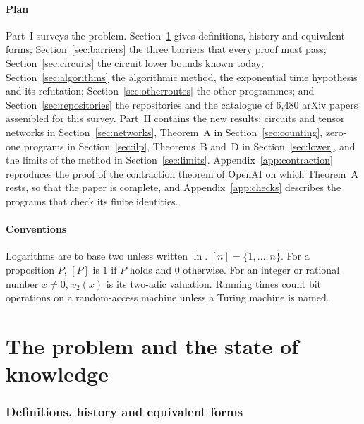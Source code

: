 \documentclass[11pt,reqno]{amsart}
\numberwithin{equation}{section}
\theoremstyle{plain}
\theoremstyle{definition}
\theoremstyle{remark}
\newcommand{\oai}{OpenAI}
\newcommand{\vtwo}{v_2}
\begin{document}
\subsection{Plan}
Part~I surveys the problem. Section~\ref{sec:history} gives definitions, history
and equivalent forms; Section~\ref{sec:barriers} the three barriers that every
proof must pass; Section~\ref{sec:circuits} the circuit lower bounds known
today; Section~\ref{sec:algorithms} the algorithmic method, the exponential time
hypothesis and its refutation; Section~\ref{sec:otherroutes} the other
programmes; and Section~\ref{sec:repositories} the repositories and the
catalogue of 6,480 arXiv papers assembled for this survey. Part~II contains the
new results: circuits and tensor networks in Section~\ref{sec:networks},
Theorem~A in Section~\ref{sec:counting}, zero-one programs in
Section~\ref{sec:ilp}, Theorems~B and~D in Section~\ref{sec:lower}, and the
limits of the method in Section~\ref{sec:limits}.
Appendix~\ref{app:contraction} reproduces the proof of the contraction theorem
of \oai{} \cite[Appendix D.4]{OAI26} on which Theorem~A rests, so that the paper
is complete, and Appendix~\ref{app:checks} describes the programs that check its
finite identities.

\subsection*{Conventions}
Logarithms are to base two unless written $\ln$. $[n]=\{1,\dots,n\}$. For a
proposition $P$, $[P]$ is $1$ if $P$ holds and $0$ otherwise. For an integer or
rational number $x\ne0$, $\vtwo(x)$ is its two-adic valuation. Running times
count bit operations on a random-access machine unless a Turing machine is named.

\part{The problem and the state of knowledge}

\section{Definitions, history and equivalent forms}\label{sec:history}
\end{document}
